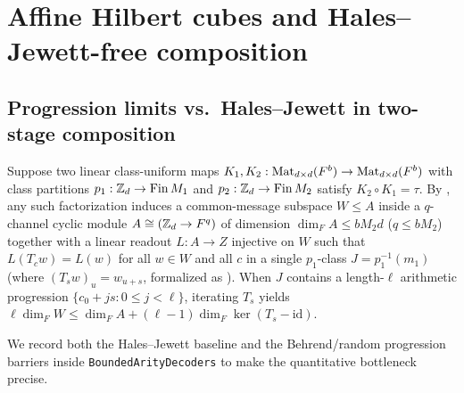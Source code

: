 \section{Affine Hilbert cubes and Hales--Jewett-free composition}\label{sec:cubes}

\subsection{Progression limits vs.\ Hales--Jewett in two-stage composition}\label{sec:hj-wall}

Suppose two linear class-uniform maps
$K_1, K_2 : \operatorname{Mat}_{d\times d}(F^b) \to \operatorname{Mat}_{d\times d}(F^b)$ with class partitions
$p_1 : \mathbb{Z}_d \to \mathrm{Fin}\,M_1$ and $p_2 : \mathbb{Z}_d \to \mathrm{Fin}\,M_2$ satisfy
$K_2 \circ K_1 = \tau$. By \cite[Section~6, Lemma~6.1 and Theorem~6.3]{SharedDecoders2026}, any
such factorization induces a common-message subspace $W \le A$ inside a $q$-channel cyclic module
$A \cong (\mathbb{Z}_d \to F^q)$ of dimension $\dim_F A \le b M_2 d$ ($q \le b M_2$) together with a linear
readout $L : A \to Z$ injective on $W$ such that $L(T_c w) = L(w)$ for all $w \in W$ and all $c$
in a single $p_1$-class $J = p_1^{-1}(m_1)$ (where $(T_s w)_u = w_{u+s}$, formalized as
). When $J$ contains a length-$\ell$ arithmetic progression
$\{c_0 + j s : 0 \le j < \ell\}$, iterating $T_s$ yields
$\ell \dim_F W \le \dim_F A + (\ell - 1)\dim_F\ker(T_s - \mathrm{id})$.

We record both the Hales--Jewett baseline and the Behrend/random progression barriers inside
\texttt{BoundedArityDecoders} to make the quantitative bottleneck precise.

